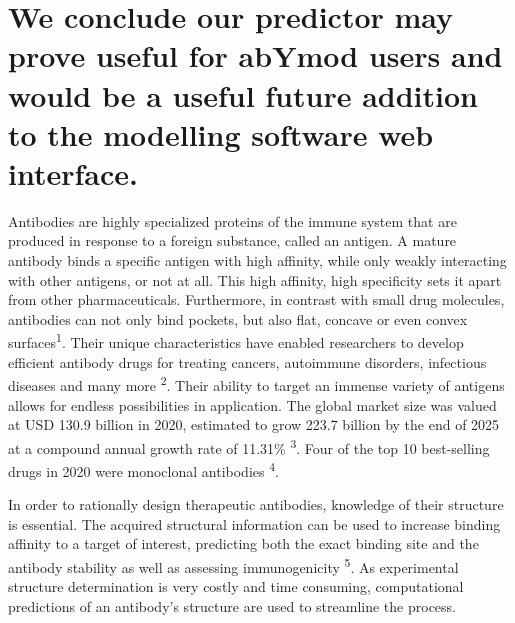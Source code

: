 \documentclass[
]{article}
\begin{document}
\hypertarget{we-conclude-our-predictor-may-prove-useful-for-abymod-users-and-would-be-a-useful-future-addition-to-the-modelling-software-web-interface.}{%
\section{\texorpdfstring{We conclude our predictor may prove useful for
abYmod users and would be a useful future addition to the modelling
software web interface.
}{We conclude our predictor may prove useful for abYmod users and would be a useful future addition to the modelling software web interface. }}\label{we-conclude-our-predictor-may-prove-useful-for-abymod-users-and-would-be-a-useful-future-addition-to-the-modelling-software-web-interface.}}

Antibodies are highly specialized proteins of the immune system that are
produced in response to a foreign substance, called an antigen. A mature
antibody binds a specific antigen with high affinity, while only weakly
interacting with other antigens, or not at all. This high affinity, high
specificity sets it apart from other pharmaceuticals. Furthermore, in
contrast with small drug molecules, antibodies can not only bind
pockets, but also flat, concave or even convex
surfaces\textsuperscript{1}. Their unique characteristics have enabled
researchers to develop efficient antibody drugs for treating cancers,
autoimmune disorders, infectious diseases and many more
\textsuperscript{2}. Their ability to target an immense variety of
antigens allows for endless possibilities in application. The global
market size was valued at USD 130.9 billion in 2020, estimated to grow
223.7 billion by the end of 2025 at a compound annual growth rate of
11.31\% \textsuperscript{3}. Four of the top 10 best-selling drugs in
2020 were monoclonal antibodies \textsuperscript{4}.

In order to rationally design therapeutic antibodies, knowledge of their
structure is essential. The acquired structural information can be used
to increase binding affinity to a target of interest, predicting both
the exact binding site and the antibody stability as well as assessing
immunogenicity \textsuperscript{5}. As experimental structure
determination is very costly and time consuming, computational
predictions of an antibody's structure are used to streamline the
process.
\end{document}
